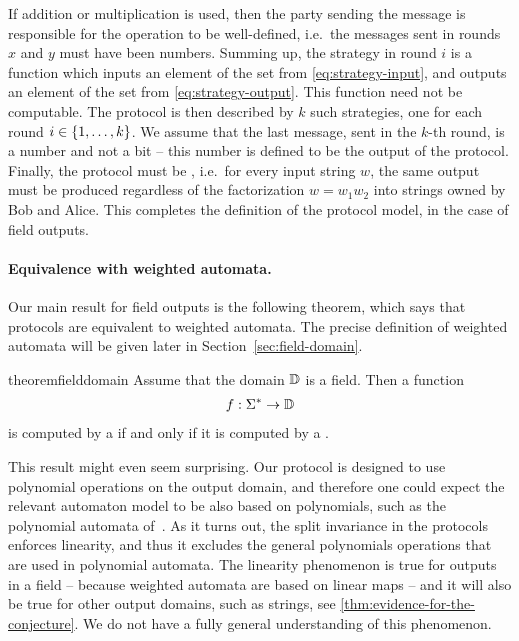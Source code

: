 If addition or multiplication is used, then the party sending the message is responsible for the operation to be well-defined, i.e.~the messages sent in rounds $x$ and $y$ must have been numbers.
Summing up, the strategy in round $i$ is a function which inputs an element of the set from \eqref{eq:strategy-input}, and outputs an element of the set from \eqref{eq:strategy-output}. This function need not be computable. The protocol is then described by $k$ such strategies, one for each round $i \in \{1,\ldots,k\}$. We assume that the last message, sent in the $k$-th round, is a number and not a bit -- this number is defined to be the output of the protocol. 
Finally, the protocol must be , i.e.~for every input string $w$, the same output must be produced regardless of the factorization $w = w_1 w_2$ into strings owned by Bob and Alice. This completes the definition of the protocol model, in the case of field outputs.


\paragraph*{Equivalence with weighted automata.} Our main result for field outputs is the following theorem, which says that protocols are equivalent to weighted automata. The precise definition of weighted automata will be given later in Section~\ref{sec:field-domain}.



\begin{restatable}{theorem}{fielddomain}
    \label{thm:field-domain}
     Assume that the domain $\mathbb D$ is a field. Then a function 
    \begin{align*}
    f : \Sigma^* \to \mathbb D
    \end{align*}  is computed by a  if and only if it is  computed by a .
\end{restatable}



  This result might even seem surprising. Our protocol is designed to use polynomial operations on the output domain, and therefore one could expect the relevant automaton model to be also based on polynomials, such as the  polynomial automata of~\cite{DBLP:conf/lics/BenediktDSW17}. As it turns out, the split invariance in the protocols  enforces linearity, and thus it excludes the general polynomials operations that are used in polynomial automata. The linearity phenomenon is true for outputs in a field -- because weighted automata are based on linear maps -- and it will also be true for other output domains, such as strings, see \cref{thm:evidence-for-the-conjecture}. We do not have a fully general understanding of this phenomenon.

